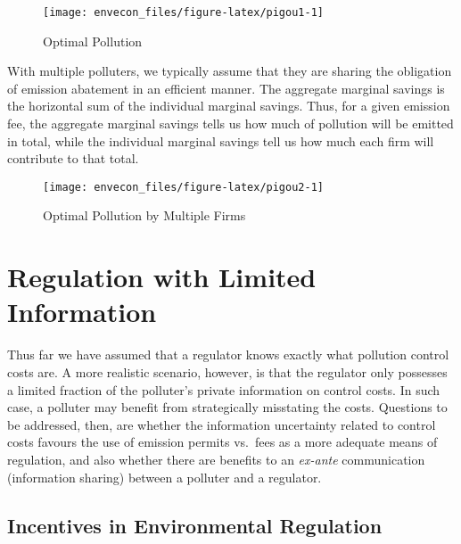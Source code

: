 \documentclass[
]{book}
\begin{document}
\begin{figure}

{\centering \texttt{[image: envecon\_files/figure-latex/pigou1-1]} 

}

\caption{Optimal Pollution}\label{fig:pigou1}
\end{figure}

With multiple polluters, we typically assume that they are sharing the obligation of emission abatement in an efficient manner. The aggregate marginal savings is the horizontal sum of the individual marginal savings. Thus, for a given emission fee, the aggregate marginal savings tells us how much of pollution will be emitted in total, while the individual marginal savings tell us how much each firm will contribute to that total.

\begin{figure}

{\centering \texttt{[image: envecon\_files/figure-latex/pigou2-1]} 

}

\caption{Optimal Pollution by Multiple Firms}\label{fig:pigou2}
\end{figure}

\hypertarget{regulation-with-limited-information}{%
\chapter{Regulation with Limited Information}\label{regulation-with-limited-information}}

Thus far we have assumed that a regulator knows exactly what pollution control costs are. A more realistic scenario, however, is that the regulator only possesses a limited fraction of the polluter's private information on control costs.
In such case, a polluter may benefit from strategically misstating the costs. Questions to be addressed, then, are whether the information uncertainty related to control costs favours the use of emission permits vs.~fees as a more adequate means of regulation, and also whether there are benefits to an \emph{ex-ante} communication (information sharing) between a polluter and a regulator.

\hypertarget{incentives-in-environmental-regulation}{%
\section{Incentives in Environmental Regulation}\label{incentives-in-environmental-regulation}}
\end{document}
